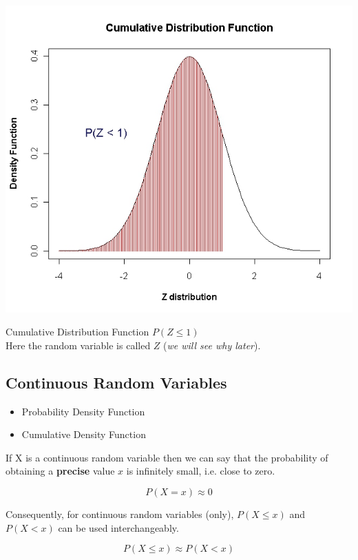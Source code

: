 \begin{center}
	\includegraphics[scale=0.35]{images/6ACDF}
\end{center}
Cumulative Distribution Function $P(Z \leq 1)$ \\ Here the random variable is called $Z$ (\textit{we will see why later}).





{
\subsection{Continuous Random Variables}

\begin{itemize}
\item Probability Density Function
\item Cumulative Density Function
\end{itemize}


If X is a continuous random variable then we can say that the probability of obtaining a \textbf{precise} value $x$ is infinitely small, i.e. close to zero.

\[P(X=x) \approx 0 \]

Consequently, for continuous random variables (only),  $P(X \leq x)$ and $P(X < x)$ can be used interchangeably.

\[P(X \leq x) \approx P(X < x) \]


}







